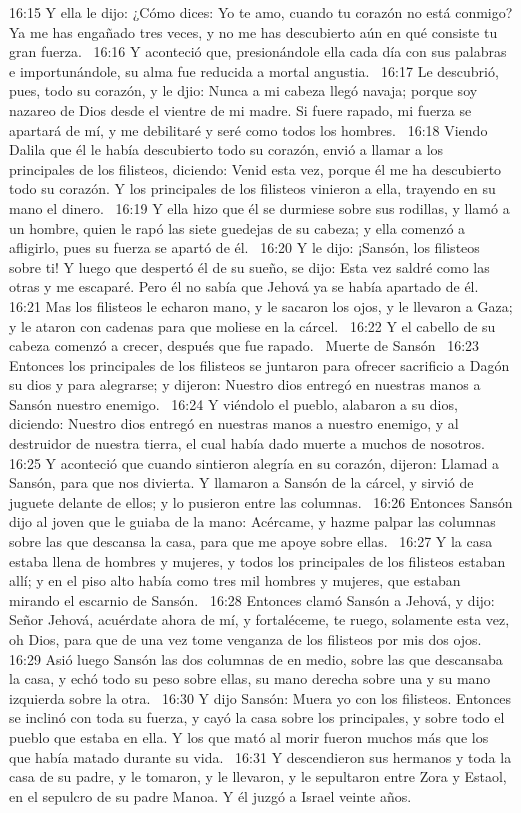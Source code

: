 16:15 Y ella le dijo: ¿Cómo dices: Yo te amo, cuando tu corazón no está conmigo? Ya me has engañado tres veces, y no me has descubierto aún en qué consiste tu gran fuerza.  
16:16 Y aconteció que, presionándole ella cada día con sus palabras e importunándole, su alma fue reducida a mortal angustia.  
16:17 Le descubrió, pues, todo su corazón, y le djio: Nunca a mi cabeza llegó navaja; porque soy nazareo de Dios desde el vientre de mi madre. Si fuere rapado, mi fuerza se apartará de mí, y me debilitaré y seré como todos los hombres.  
16:18 Viendo Dalila que él le había descubierto todo su corazón, envió a llamar a los principales de los filisteos, diciendo: Venid esta vez, porque él me ha descubierto todo su corazón. Y los principales de los filisteos vinieron a ella, trayendo en su mano el dinero.  
16:19 Y ella hizo que él se durmiese sobre sus rodillas, y llamó a un hombre, quien le rapó las siete guedejas de su cabeza; y ella comenzó a afligirlo, pues su fuerza se apartó de él.  
16:20 Y le dijo: ¡Sansón, los filisteos sobre ti! Y luego que despertó él de su sueño, se dijo: Esta vez saldré como las otras y me escaparé. Pero él no sabía que Jehová ya se había apartado de él.  
16:21 Mas los filisteos le echaron mano, y le sacaron los ojos, y le llevaron a Gaza; y le ataron con cadenas para que moliese en la cárcel.  
16:22 Y el cabello de su cabeza comenzó a crecer, después que fue rapado.  
Muerte de Sansón  
16:23 Entonces los principales de los filisteos se juntaron para ofrecer sacrificio a Dagón su dios y para alegrarse; y dijeron: Nuestro dios entregó en nuestras manos a Sansón nuestro enemigo.  
16:24 Y viéndolo el pueblo, alabaron a su dios, diciendo: Nuestro dios entregó en nuestras manos a nuestro enemigo, y al destruidor de nuestra tierra, el cual había dado muerte a muchos de nosotros. 
16:25 Y aconteció que cuando sintieron alegría en su corazón, dijeron: Llamad a Sansón, para que nos divierta. Y llamaron a Sansón de la cárcel, y sirvió de juguete delante de ellos; y lo pusieron entre las columnas.  
16:26 Entonces Sansón dijo al joven que le guiaba de la mano: Acércame, y hazme palpar las columnas sobre las que descansa la casa, para que me apoye sobre ellas.  
16:27 Y la casa estaba llena de hombres y mujeres, y todos los principales de los filisteos estaban allí; y en el piso alto había como tres mil hombres y mujeres, que estaban mirando el escarnio de Sansón.  
16:28 Entonces clamó Sansón a Jehová, y dijo: Señor Jehová, acuérdate ahora de mí, y fortaléceme, te ruego, solamente esta vez, oh Dios, para que de una vez tome venganza de los filisteos por mis dos ojos.  
16:29 Asió luego Sansón las dos columnas de en medio, sobre las que descansaba la casa, y echó todo su peso sobre ellas, su mano derecha sobre una y su mano izquierda sobre la otra.  
16:30 Y dijo Sansón: Muera yo con los filisteos. Entonces se inclinó con toda su fuerza, y cayó la casa sobre los principales, y sobre todo el pueblo que estaba en ella. Y los que mató al morir fueron muchos más que los que había matado durante su vida.  
16:31 Y descendieron sus hermanos y toda la casa de su padre, y le tomaron, y le llevaron, y le sepultaron entre Zora y Estaol, en el sepulcro de su padre Manoa. Y él juzgó a Israel veinte años.  
